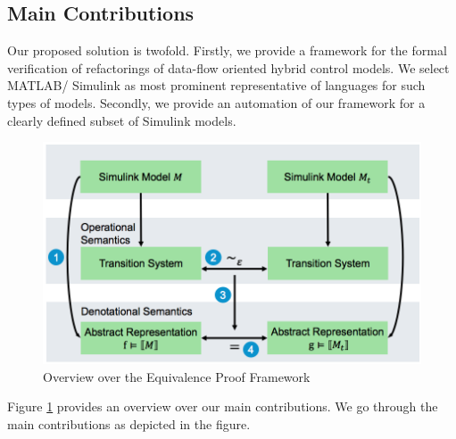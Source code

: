 \documentclass[conference]{IEEEtran}
\begin{document}
\subsection*{Main Contributions}
Our proposed solution is twofold. Firstly, we provide a framework for the formal verification of refactorings of data-flow oriented hybrid control models. We select MATLAB/ Simulink as most prominent representative of languages for such types of models. 
Secondly, we provide an automation of our framework for a clearly defined subset of Simulink models. 
\begin{figure}
	
 	\centering
	\includegraphics[scale=0.3]{Figures/Approach.PNG}

 	\caption{Overview over the Equivalence Proof Framework}
 	\label{fig:Approach}
 \end{figure}
Figure \ref{fig:Approach} provides an overview over our main contributions. We go through the main contributions as depicted in the figure.
\end{document}
